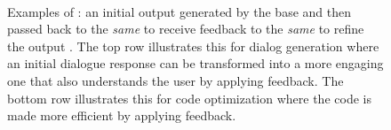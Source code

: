 \begin{figure}[t]
\begin{subfigure}[T]{0.31\textwidth}
\begin{verbatim}
  
    \end{verbatim}
\end{subfigure}%
\caption{Examples of \ours: an initial output \colorbox{Box1Color}{\smallstrut} generated by the base \llm and then passed back to the \textit{same} \llm to receive feedback \colorbox{Box2Color}{\smallstrut} to the \textit{same} \llm to refine the output \colorbox{Box3Color}{\smallstrut}. The top row illustrates this for dialog generation where an initial dialogue response can be transformed into a more engaging one that also understands the user by applying feedback. The bottom row illustrates this for code optimization where the code is made more efficient by applying feedback.
}
\label{fig:modules}
\end{figure}
